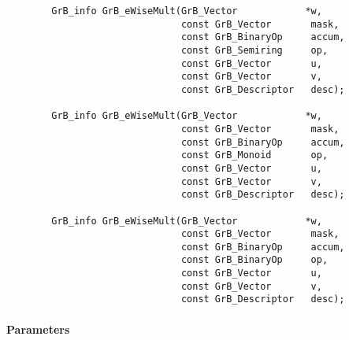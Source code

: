 \begin{verbatim}
        GrB_info GrB_eWiseMult(GrB_Vector            *w,
                               const GrB_Vector       mask,
                               const GrB_BinaryOp     accum,
                               const GrB_Semiring     op, 
                               const GrB_Vector       u,
                               const GrB_Vector       v,
                               const GrB_Descriptor   desc);
                            
        GrB_info GrB_eWiseMult(GrB_Vector            *w,
                               const GrB_Vector       mask,
                               const GrB_BinaryOp     accum,
                               const GrB_Monoid       op, 
                               const GrB_Vector       u,
                               const GrB_Vector       v,
                               const GrB_Descriptor   desc);
                            
        GrB_info GrB_eWiseMult(GrB_Vector            *w,
                               const GrB_Vector       mask,
                               const GrB_BinaryOp     accum,
                               const GrB_BinaryOp     op, 
                               const GrB_Vector       u,
                               const GrB_Vector       v,
                               const GrB_Descriptor   desc);
\end{verbatim}

\paragraph{Parameters}

